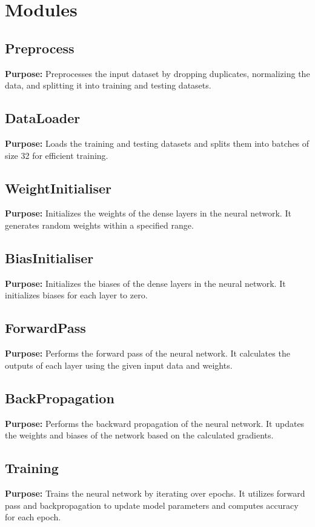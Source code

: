 \documentclass[12pt]{article}
\begin{document}
	\section{Modules}
	
	\subsection{Preprocess}
	\textbf{Purpose:} Preprocesses the input dataset by dropping duplicates, normalizing the data, and splitting it into training and testing datasets. 
	
	\subsection{DataLoader}
	\textbf{Purpose:} Loads the training and testing datasets and splits them into batches of size 32 for efficient training.
	
	\subsection{WeightInitialiser}
	\textbf{Purpose:} Initializes the weights of the dense layers in the neural network. It generates random weights within a specified range.
	
	\subsection{BiasInitialiser}
	\textbf{Purpose:} Initializes the biases of the dense layers in the neural network. It initializes biases for each layer to zero.
	
	\subsection{ForwardPass}
	\textbf{Purpose:} Performs the forward pass of the neural network. It calculates the outputs of each layer using the given input data and weights.
	
	\subsection{BackPropagation}
	\textbf{Purpose:} Performs the backward propagation of the neural network. It updates the weights and biases of the network based on the calculated gradients.
	
	\subsection{Training}
	\textbf{Purpose:} Trains the neural network by iterating over epochs. It utilizes forward pass and backpropagation to update model parameters and computes accuracy for each epoch.
	
\end{document}
